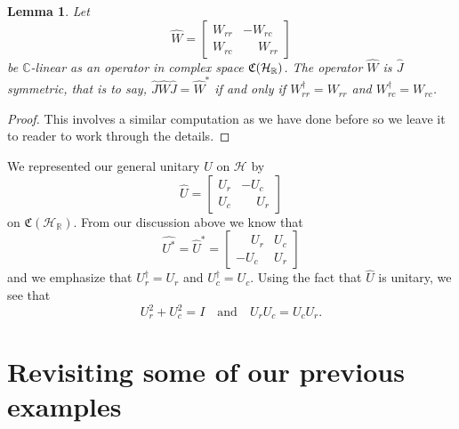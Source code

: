 \documentclass{dis}
\newcommand{\phm}{\phantom{-}}
\theoremstyle{plain}
\newtheorem{Lemma}[equation]{Lemma}
\theoremstyle{definition}
\def\C{\mathbb{C}}
\def\R{\mathbb{R}}
\newcommand{\0}{{\color{lightgray}0}}
\begin{document}
\begin{Lemma} Let
$$\widehat{W} = \begin{bmatrix} W_{rr} & - W_{rc}\\ W_{rc} &\phm W_{rr}\end{bmatrix}$$
be $\C$-linear as an operator in complex space $\frak{C}(\mathcal{H}_{\R})$. The  operator $\widehat{W}$
is $\widehat{J}$ symmetric, that is to say, $\widehat{J} \widehat{W} \widehat{J} = \widehat{W}^{*}$ if and only if $W_{rr}^{\dagger} = W_{rr}$ and $W_{rc}^{\dagger} = W_{rc}$.
\end{Lemma}

\begin{proof}
This involves a similar computation as we have done before so we leave it to reader to work through the details. 
\end{proof}

We represented our general unitary $U$ on $\mathcal{H}$ by
$$\widehat{U} =  \begin{bmatrix}
U_r & - U_c\\
U_c &\phm U_r
\end{bmatrix}$$
on $\mathfrak{C}(\mathcal{H}_{\R})$. From our discussion above we know that
$$\widehat{U^{*}} = \widehat{U}^{*} = \begin{bmatrix}\phm U_{r} & U_{c}\\ - U_{c} & U_{r}\end{bmatrix}$$
and we emphasize that $U_{r}^{\dagger} = U_{r}$ and $U_{c}^{\dagger} = U_{c}$. Using the fact that $\widehat{U}$ is unitary, we see that $$U_{r}^{2} + U_{c}^{2} = I \quad \mbox{and} \quad U_{r} U_{c} = U_{c} U_{r}.$$

\section{Revisiting some of our previous examples}
\end{document}
